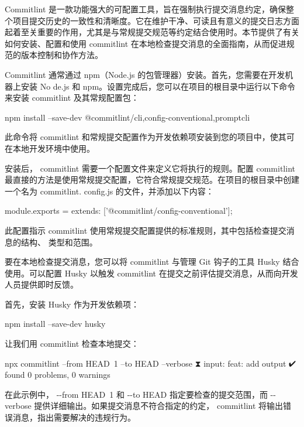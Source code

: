 
Commitlint 是一款功能强大的可配置工具，旨在强制执行提交消息约定，确保整个项目提交历史的一致性和清晰度。它在维护干净、可读且有意义的提交日志方面起着至关重要的作用，尤其是与常规提交规范等约定结合使用时。本节提供了有关如何安装、配置和使用 commitlint 在本地检查提交消息的全面指南，从而促进规范的版本控制和协作方法。


Commitlint 通常通过 npm（Node.js 的包管理器）安装。首先，您需要在开发机器上安装 No de.js 和 npm。设置完成后，您可以在项目的根目录中运行以下命令来安装 commitlint 及其常规配置包：

\begin{shell}
npm install --save-dev @commitlint/{cli,config-conventional,promptcli}
\end{shell}

此命令将 commitlint 和常规提交配置作为开发依赖项安装到您的项目中，使其可在本地开发环境中使用。


安装后， commitlint 需要一个配置文件来定义它将执行的规则。配置 commitlint 最直接的方法是使用常规提交配置，它符合常规提交规范。在项目的根目录中创建一个名为 commitlint.
config.js 的文件，并添加以下内容：

\begin{shell}
module.exports = {extends: ['@commitlint/config-conventional']};
\end{shell}

此配置指示 commitlint 使用常规提交配置提供的标准规则，其中包括检查提交消息的结构、 类型和范围。


要在本地检查提交消息，您可以将 commitlint 与管理 Git 钩子的工具 Husky 结合使用。可以配置 Husky 以触发 commitlint 在提交之前评估提交消息，从而向开发人员提供即时反馈。

首先，安装 Husky 作为开发依赖项：

\begin{shell}
npm install --save-dev husky
\end{shell}

让我们用 commitlint 检查本地提交：

\begin{shell}
npx commitlint --from HEAD~1 --to HEAD --verbose
⧗ input: feat: add output
✔ found 0 problems, 0 warnings
\end{shell}


在此示例中， -{}-from HEAD~1 和 -{}-to HEAD 指定要检查的提交范围，而 -{}-verbose 提供详细输出。如果提交消息不符合指定的约定， commitlint 将输出错误消息，指出需要解决的违规行为。

